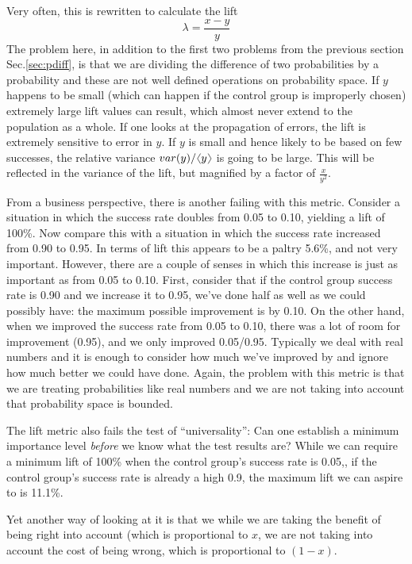 \documentclass[12pt]{report}
\newcommand{\bdm}{\begin{displaymath}} %
\newcommand{\edm}{\end{displaymath}} %
\newcommand{\langl}{\begin{picture}(4.5,7)
\put(1.1,2.5){\rotatebox{60}{\line(1,0){5.5}}}
\put(1.1,2.5){\rotatebox{300}{\line(1,0){5.5}}}
\end{picture}}
\newcommand{\rangl}{\begin{picture}(4.5,7)
\put(.9,2.5){\rotatebox{120}{\line(1,0){5.5}}}
\put(.9,2.5){\rotatebox{240}{\line(1,0){5.5}}}
\end{picture}}
\newcommand{\mymean}[1]{\ensuremath{\langl{#1}\rangl}} %
\begin{document}
Very often, this is rewritten to calculate the lift
\bdm
\lambda = \frac{x-y}{y}
\edm
The problem here, in addition to the first two problems from the previous section Sec.\ref{sec:pdiff}, is that we are dividing the difference of two probabilities
by a probability and these are not well defined operations on
probability space. If \(y\) happens to be small (which can happen if
the control group is improperly chosen) extremely large lift values
can result, which almost never extend to the population as a
whole. If one looks at the propagation of errors, the
lift is extremely sensitive to error in \(y\). If \(y\) is small and hence likely to be based on few successes, the relative variance \(var(y)/\mymean{y}\) is going to be large. This will be reflected in the variance of the lift, but magnified by a factor of \(\frac{x}{y^2}\). 

From a business perspective, there is another failing with this metric.
Consider a situation in which the success rate doubles from 0.05 to 0.10,
yielding a lift of 100\%. Now compare this with a situation in which the
success rate increased from 0.90 to 0.95. In terms of lift this appears to be
a paltry 5.6\%, and not very important. However, there are a couple of senses
in which this increase is just as important as from 0.05 to 0.10. First,
consider that if the control group success rate is 0.90 and we increase it
to 0.95, we've done half as well as we could possibly have: the maximum
possible improvement is by 0.10. On the other hand, when
we improved the success rate from
0.05 to 0.10, there was a lot of room for improvement (0.95), and we only
improved 0.05/0.95. Typically we deal with real numbers and it is enough to
consider how much we've improved by and ignore how much better we could have
done. Again, the problem with this metric is that we are
treating probabilities like real numbers and we are not taking into account
that probability space is bounded.

The lift metric also fails the test of ``universality'': Can one establish a
minimum importance level {\em before}
we know what the test results are? While we
can require a minimum lift of 100\% when the control group's success rate
is 0.05,, if the control group's success rate is already a high 0.9,
the maximum lift we can aspire to is 11.1\%.

Yet another way of looking at it is that we while we are taking the benefit of
being right into account (which is proportional to \(x\),
we are not taking into account the cost of being wrong, which is
proportional to \((1-x)\).
\end{document}
